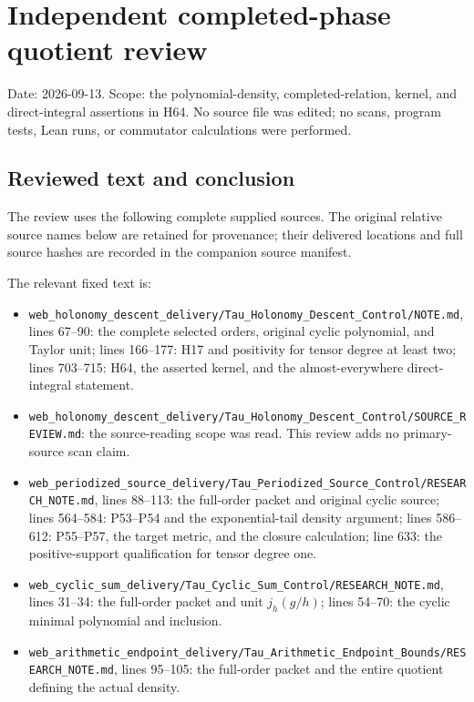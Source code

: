 \documentclass{article}
\begin{document}
\maketitle
\section{Independent completed-phase quotient review}\label{independent-completed-phase-quotient-review}

Date: 2026-09-13. Scope: the polynomial-density, completed-relation, kernel, and direct-integral assertions in H64. No source file was edited; no scans, program tests, Lean runs, or commutator calculations were performed.

\subsection{Reviewed text and conclusion}\label{reviewed-text-and-conclusion}

The review uses the following complete supplied sources. The original relative source names below are retained for provenance; their delivered locations and full source hashes are recorded in the companion source manifest.

The relevant fixed text is:

\begingroup\raggedright
\begin{itemize}
\tightlist
\item
  \nolinkurl{web_holonomy_descent_delivery/Tau_Holonomy_Descent_Control/NOTE.md}, lines 67--90: the complete selected orders, original cyclic polynomial, and Taylor unit; lines 166--177: H17 and positivity for tensor degree at least two; lines 703--715: H64, the asserted kernel, and the almost-everywhere direct-integral statement.
\item
  \nolinkurl{web_holonomy_descent_delivery/Tau_Holonomy_Descent_Control/SOURCE_REVIEW.md}: the source-reading scope was read. This review adds no primary-source scan claim.
\item
  \nolinkurl{web_periodized_source_delivery/Tau_Periodized_Source_Control/RESEARCH_NOTE.md}, lines 88--113: the full-order packet and original cyclic source; lines 564--584: P53--P54 and the exponential-tail density argument; lines 586--612: P55--P57, the target metric, and the closure calculation; line 633: the positive-support qualification for tensor degree one.
\item
  \nolinkurl{web_cyclic_sum_delivery/Tau_Cyclic_Sum_Control/RESEARCH_NOTE.md}, lines 31--34: the full-order packet and unit \(j_h(g/h)\); lines 54--70: the cyclic minimal polynomial and inclusion.
\item
  \nolinkurl{web_arithmetic_endpoint_delivery/Tau_Arithmetic_Endpoint_Bounds/RESEARCH_NOTE.md}, lines 95--105: the full-order packet and the entire quotient defining the actual density.
\end{itemize}
\endgroup
\end{document}
